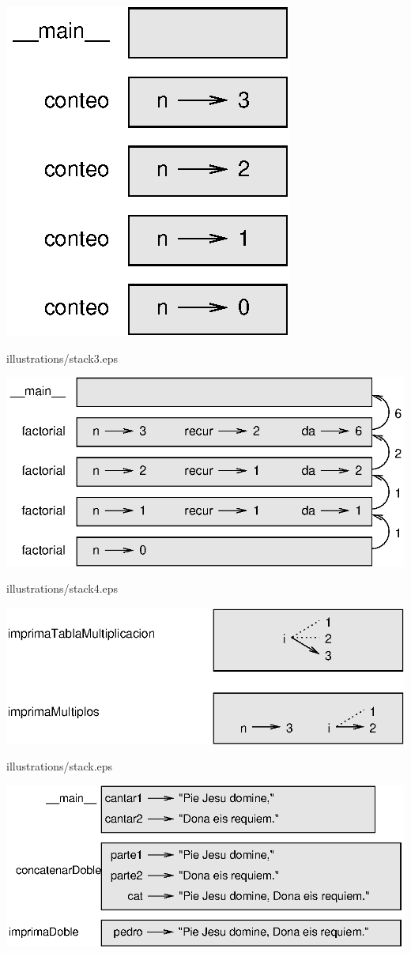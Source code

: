 \centerline{\includegraphics{illustrations/stack2.eps}}

illustrations/stack3.eps

\centerline{\includegraphics{illustrations/stack3.eps}}

illustrations/stack4.eps

\centerline{\includegraphics{illustrations/stack4.eps}}

illustrations/stack.eps

\centerline{\includegraphics{illustrations/stack.eps}}

